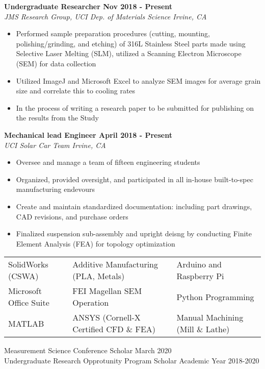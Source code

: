 \documentclass[10pt]{article}
\begin{document}
\vspace{0.08in}

\myrule

\noindent\textbf{Undergraduate Researcher \hfill Nov 2018 - Present}\\
\textit{JMS Research Group, UCI Dep. of Materials Science \hfill Irvine, CA}
\begin{itemize}
    \item Performed sample preparation procedures (cutting, mounting, polishing/grinding, and etching) of 316L Stainless Steel parts made using Selective Laser Melting (SLM), utilized a Scanning Electron Microscope (SEM) for data collection
    \item Utilized ImageJ and Microsoft Excel to analyze SEM images for average grain size and correlate this to cooling rates
    \item In the process of writing a research paper to be submitted for publishing on the results from the Study
\end{itemize}

\vspace{0.15in}

\noindent\textbf{Mechanical lead Engineer \hfill April 2018 - Present}\\
\textit{UCI Solar Car Team \hfill Irvine, CA}
\begin{itemize}
    \item Oversee and manage a team of fifteen engineering students
    \item Organized, provided oversight, and participated in all in-house built-to-spec manufacturing endevours
    \item Create and maintain standardized documentation: including part drawings, CAD revisions, and purchase orders
    \item Finalized suspension sub-assembly and upright deisng by conducting Finite Element Analysis (FEA) for topology optimization
\end{itemize}

\vspace{0.15in}

\myrule

\noindent\begin{tabular}{lll}
SolidWorks (CSWA)      & Additive Manufacturing (PLA, Metals) & Arduino and Raspberry Pi         \\
Microsoft Office Suite & FEI Magellan SEM Operation                    & Python Programming               \\
MATLAB                 & ANSYS (Cornell-X Certified CFD \& FEA)        & Manual Machining (Mill \& Lathe)
\end{tabular}

\vspace{0.15in}

\myrule
{} Measurement Science Conference Scholar \hfill March 2020\\
Undergraduate Research Opprotunity Program Scholar \hfill Academic Year 2018-2020
\end{document}
